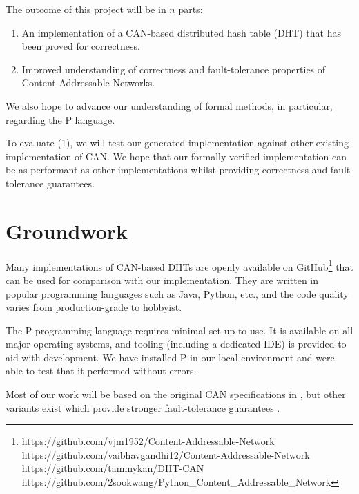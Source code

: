 \documentclass{scrartcl}
\begin{document}
The outcome of this project will be in $n$ parts:
\begin{enumerate}
    \item An implementation of a CAN-based distributed hash table (DHT) that has been proved for correctness.
    \item Improved understanding of correctness and fault-tolerance properties of Content Addressable Networks. 
\end{enumerate}
We also hope to advance our understanding of formal methods, in particular, regarding the P language.

To evaluate (1), we will test our generated implementation against other existing implementation of CAN. We hope that our formally verified implementation can be as performant as other implementations whilst providing correctness and fault-tolerance guarantees.

\section{Groundwork}
Many implementations of CAN-based DHTs are openly available on GitHub\footnote{https://github.com/vjm1952/Content-Addressable-Network\\https://github.com/vaibhavgandhi12/Content-Addressable-Network\\https://github.com/tammykan/DHT-CAN\\https://github.com/2sookwang/Python\_Content\_Addressable\_Network} that can be used for comparison with our implementation. They are written in popular programming languages such as Java, Python, etc., and the code quality varies from production-grade to hobbyist.

The P programming language requires minimal set-up to use. It is available on all major operating systems, and tooling (including a dedicated IDE) is provided to aid with development. We have installed P in our local environment and were able to test that it performed without errors.

Most of our work will be based on the original CAN specifications in \cite{10.1145/964723.383072}, but other variants exist which provide stronger fault-tolerance guarantees \cite{10.1007/11576235_79}.

\appendix
\end{document}

